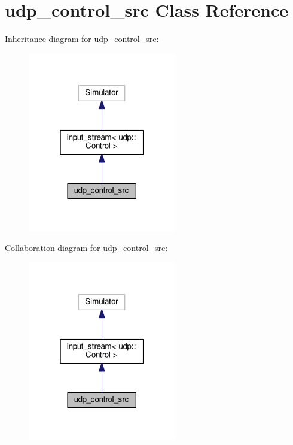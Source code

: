 \hypertarget{classudp__control__src}{}\section{udp\+\_\+control\+\_\+src Class Reference}
\label{classudp__control__src}


Inheritance diagram for udp\+\_\+control\+\_\+src\+:\nopagebreak
\begin{figure}[H]
\begin{center}
\leavevmode
\includegraphics[width=184pt]{classudp__control__src__inherit__graph}
\end{center}
\end{figure}


Collaboration diagram for udp\+\_\+control\+\_\+src\+:\nopagebreak
\begin{figure}[H]
\begin{center}
\leavevmode
\includegraphics[width=184pt]{classudp__control__src__coll__graph}
\end{center}
\end{figure}
